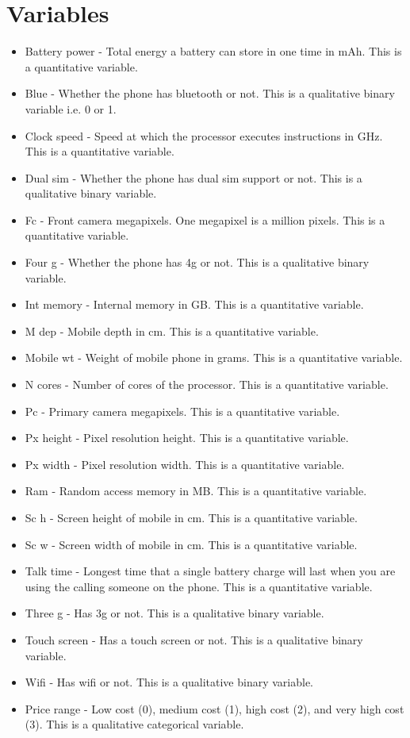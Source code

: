 \documentclass{article}
\begin{document}
\section{Variables}
\begin{itemize}
    \item Battery power - Total energy a battery can store in one time in mAh. This is a quantitative variable.
    \item Blue - Whether the phone has bluetooth or not. This is a qualitative binary variable i.e. 0 or 1.
    \item Clock speed - Speed at which the processor executes instructions in GHz. This is a quantitative variable.
    \item Dual sim - Whether the phone has dual sim support or not. This is a qualitative binary variable.
    \item Fc - Front camera megapixels. One megapixel is a million pixels. This is a quantitative variable.
    \item Four g - Whether the phone has 4g or not. This is a qualitative binary variable.
    \item Int memory - Internal memory in GB. This is a quantitative variable.
    \item M dep - Mobile depth in cm. This is a quantitative variable.
    \item Mobile wt - Weight of mobile phone in grams. This is a quantitative variable.
    \item N cores - Number of cores of the processor. This is a quantitative variable.
    \item Pc - Primary camera megapixels. This is a quantitative variable.
    \item Px height - Pixel resolution height. This is a quantitative variable.
    \item Px width - Pixel resolution width. This is a quantitative variable.
    \item Ram - Random access memory in MB. This is a quantitative variable.
    \item Sc h - Screen height of mobile in cm. This is a quantitative variable.
    \item Sc w - Screen width of mobile in cm. This is a quantitative variable.
    \item Talk time - Longest time that a single battery charge will last when you are using the calling someone on the phone. This is a quantitative variable.
    \item Three g - Has 3g or not. This is a qualitative binary variable.
    \item Touch screen - Has a touch screen or not. This is a qualitative binary variable.
    \item Wifi - Has wifi or not. This is a qualitative binary variable.
    \item Price range - Low cost (0), medium cost (1), high cost (2), and very high cost (3). This is a qualitative categorical variable.
\end{itemize}
\end{document}
